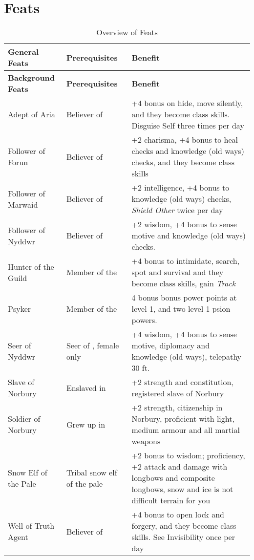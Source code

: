 \section{Feats}
\label{sec:Feats}

\begin{table*}[!htb]
  \caption{Overview of Feats}
  \begin{tabular}{l l p{7cm}}
    \textbf{General Feats}    & \textbf{Prerequisites}           & \textbf{Benefit} \\
    \hline
    \textbf{Background Feats} & \textbf{Prerequisites}           & \textbf{Benefit} \\
    Adept of Aria             & Believer of \nameref{sec:Aria}   & +4 bonus on hide, move silently, and they become class skills. Disguise Self three times per day \\
    Follower of Forun         & Believer of \nameref{sec:Forun}  & +2 charisma, +4 bonus to heal checks and knowledge (old ways) checks, and they become class skills \\
    Follower of Marwaid       & Believer of \nameref{sec:Marwaid}& +2 intelligence, +4 bonus to knowledge (old ways) checks, \emph{Shield Other} twice per day \\
    Follower of Nyddwr        & Believer of \nameref{sec:Nyddwr} & +2 wisdom, +4 bonus to sense motive and knowledge (old ways) checks. \\
    Hunter of the Guild       & Member of the \nameref{sec:Hunters Guild} & +4 bonus to intimidate, search, spot and survival and they become class skills, gain \emph{Track} \\
    Psyker                    & Member of the \nameref{sec:Helemic Order} & 4 bonus bonus power points at level 1, and two level 1 psion powers. \\
    Seer of Nyddwr            & Seer of \nameref{sec:Nyddwr}, female only & +4 wisdom, +4 bonus to sense motive, diplomacy and knowledge (old ways), telepathy 30 ft. \\
    Slave of Norbury          & Enslaved in \nameref{sec:Norbury}& +2 strength and constitution, registered slave of Norbury \\
    Soldier of Norbury        & Grew up in \nameref{sec:Norbury} & +2 strength, citizenship in Norbury, proficient with light, medium armour and all martial weapons \\
    Snow Elf of the Pale      & Tribal snow elf of the pale      & +2 bonus to wisdom; proficiency, +2 attack and damage with longbows and composite longbows, snow and ice is not difficult terrain for you \\
    Well of Truth Agent       & Believer of \nameref{sec:Aria}   & +4 bonus to open lock and forgery, and they become class skills. See Invisibility once per day \\
  \end{tabular}
\end{table*}

